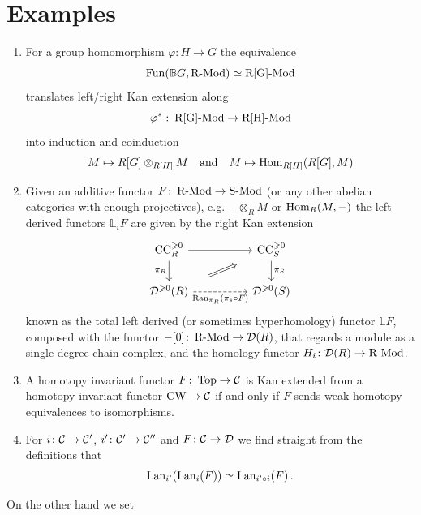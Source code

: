     \section{Examples}
        \begin{enumerate}[label=\roman*)]
            \item 
                For a group homomorphism $\varphi \colon H \to G$ the equivalence
                \begin{equation*}
                    \operatorname{Fun}(\mathbb{B}G, \operatorname{R-Mod}) \simeq \operatorname{R[G]-Mod}
                \end{equation*}
                translates left/right Kan extension along
                \begin{equation*}
                    \varphi^* \,\colon \operatorname{R[G]-Mod} \to \operatorname{R[H]-Mod}
                \end{equation*}
                into induction and coinduction
                \begin{equation*}
                    M \mapsto R[G] \otimes_{R[H]} M \quad \text{and} \quad M \mapsto \operatorname{Hom}_{R[H]}(R[G], M)
                \end{equation*}
            \item 
                Given an additive functor $F \colon \operatorname{R-Mod} \to \operatorname{S-Mod}$ (or any other abelian categories with enough projectives), e.g. $- \otimes_R M$ or $\operatorname{Hom}_R(M, -)$ the left derived functors $\mathbb{L}_i F$ are given by the right Kan extension
                \begin{equation*}
                    \begin{tikzcd}
                        \mathrm{CC}^{\geqslant 0}_R \arrow[rr] \arrow[d, "\pi_R"']            &  & \mathrm{CC}^{\geqslant 0}_S \arrow[d, "\pi_S"] \\
                        \Dd^{\geqslant 0}(R) \arrow[rr, "\Ran_{\pi_R}(\pi_s \circ F)"', dashed] \arrow[rru, shorten=5mm, Rightarrow] &  & \Dd^{\geqslant 0}(S)      
                    \end{tikzcd}
                \end{equation*}
                known as the total left derived (or sometimes hyperhomology) functor $\mathbb{L}F$, composed with the functor $-[0] \colon \operatorname{R-Mod} \to \mathcal{D}(R)$, that regards a module as a single degree chain complex, and the homology functor $H_i \colon \mathcal{D}(R) \to \operatorname{R-Mod}$.
                \item 
                    A homotopy invariant functor $F \colon \operatorname{Top} \to \mathcal{C}$ is Kan extended from a homotopy invariant functor $\mathrm{CW} \to \mathcal{C}$ if and only if $F$ sends weak homotopy equivalences to isomorphisms.
                \item 
                    For $i \colon \mathcal{C} \to \mathcal{C}'$, $i' \colon \mathcal{C}' \to \mathcal{C}''$ and $F \colon \mathcal{C} \to \mathcal{D}$ we find straight from the definitions that
                    \begin{equation*}
                        \operatorname{Lan}_{i'}(\operatorname{Lan}_i(F)) \simeq \operatorname{Lan}_{i' \circ i}(F) \,.
                    \end{equation*}
        \end{enumerate}
        On the other hand we set
